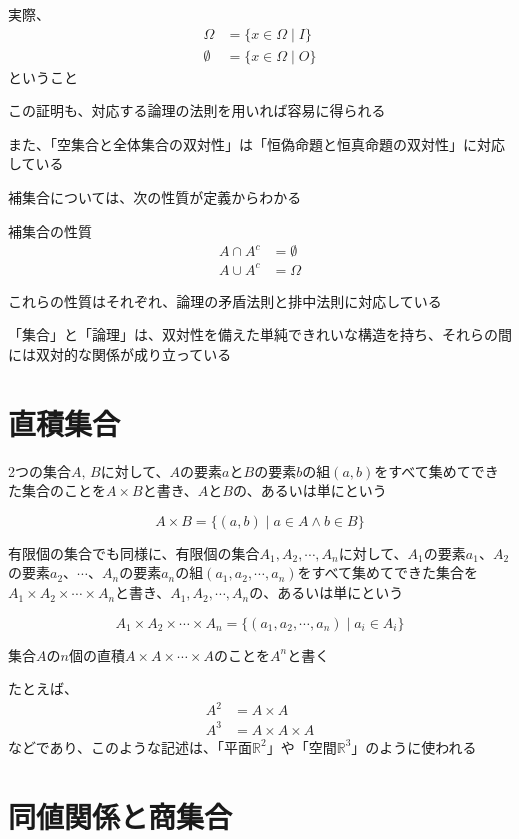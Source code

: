 \documentclass[b5paper,12pt]{jsarticle}
\begin{document}
実際、
\begin{align*}
  \Omega    & = \{x \in \Omega \mid I\} \\
  \emptyset & = \{x \in \Omega \mid O\}
\end{align*}
ということ

この証明も、対応する論理の法則を用いれば容易に得られる

\br

また、「空集合と全体集合の双対性」は「恒偽命題と恒真命題の双対性」に対応している

\sectionline

補集合については、次の性質が定義からわかる

\begin{theorem}{補集合の性質}
  \begin{align*}
    A \cap A^c & = \emptyset \\
    A \cup A^c & = \Omega
  \end{align*}
\end{theorem}

これらの性質はそれぞれ、論理の矛盾法則と排中法則に対応している

\sectionline

「集合」と「論理」は、双対性を備えた単純できれいな構造を持ち、それらの間には双対的な関係が成り立っている

\sectionline
\section{直積集合}

2つの集合$A, \, B$に対して、$A$の要素$a$と$B$の要素$b$の組$(a, b)$をすべて集めてできた集合のことを$A \times B$と書き、$A$と$B$の、あるいは単にという

\begin{equation*}
  A \times B = \{(a, b) \mid a \in A \land b \in B\}
\end{equation*}

有限個の集合でも同様に、有限個の集合$A_1, A_2, \cdots , A_n$に対して、$A_1$の要素$a_1$、$A_2$の要素$a_2$、$\cdots$、$A_n$の要素$a_n$の組$(a_1, a_2, \cdots , a_n)$をすべて集めてできた集合を$A_1 \times A_2 \times \cdots \times A_n$と書き、$A_1, A_2, \cdots , A_n$の、あるいは単にという

\begin{equation*}
  A_1 \times A_2 \times \cdots \times A_n = \{(a_1, a_2, \cdots , a_n) \mid a_i \in A_i\}
\end{equation*}

\sectionline

集合$A$の$n$個の直積$A \times A \times \cdots \times A$のことを$A^n$と書く

たとえば、
\begin{align*}
  A^2 & = A \times A          \\
  A^3 & = A \times A \times A
\end{align*}
などであり、このような記述は、「平面$\mathbb{R}^2$」や「空間$\mathbb{R}^3$」のように使われる

\sectionline
\section{同値関係と商集合}
\end{document}
